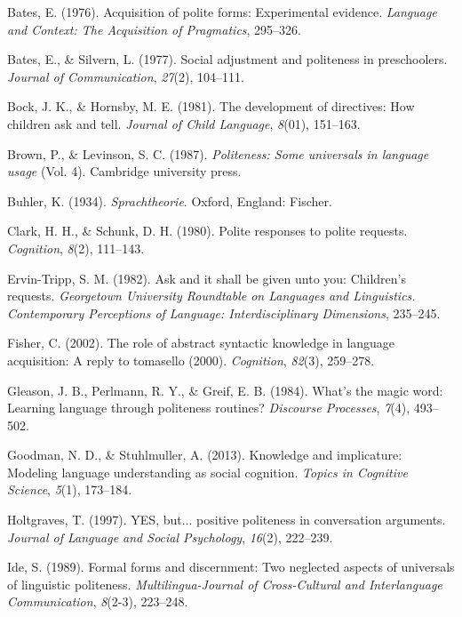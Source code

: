 \documentclass[10pt, letterpaper]{article}
\begin{document}
\hypertarget{ref-bates1976}{}
Bates, E. (1976). Acquisition of polite forms: Experimental evidence.
\emph{Language and Context: The Acquisition of Pragmatics}, 295--326.

\hypertarget{ref-bates1977}{}
Bates, E., \& Silvern, L. (1977). Social adjustment and politeness in
preschoolers. \emph{Journal of Communication}, \emph{27}(2), 104--111.

\hypertarget{ref-bock1981}{}
Bock, J. K., \& Hornsby, M. E. (1981). The development of directives:
How children ask and tell. \emph{Journal of Child Language},
\emph{8}(01), 151--163.

\hypertarget{ref-brown1987}{}
Brown, P., \& Levinson, S. C. (1987). \emph{Politeness: Some universals
in language usage} (Vol. 4). Cambridge university press.

\hypertarget{ref-buhler1934}{}
Buhler, K. (1934). \emph{Sprachtheorie}. Oxford, England: Fischer.

\hypertarget{ref-clark1980}{}
Clark, H. H., \& Schunk, D. H. (1980). Polite responses to polite
requests. \emph{Cognition}, \emph{8}(2), 111--143.

\hypertarget{ref-ervin1982}{}
Ervin-Tripp, S. M. (1982). Ask and it shall be given unto you:
Children's requests. \emph{Georgetown University Roundtable on Languages
and Linguistics. Contemporary Perceptions of Language: Interdisciplinary
Dimensions}, 235--245.

\hypertarget{ref-fisher2002}{}
Fisher, C. (2002). The role of abstract syntactic knowledge in language
acquisition: A reply to tomasello (2000). \emph{Cognition},
\emph{82}(3), 259--278.

\hypertarget{ref-gleason1984}{}
Gleason, J. B., Perlmann, R. Y., \& Greif, E. B. (1984). What's the
magic word: Learning language through politeness routines?
\emph{Discourse Processes}, \emph{7}(4), 493--502.

\hypertarget{ref-goodman2013}{}
Goodman, N. D., \& Stuhlmuller, A. (2013). Knowledge and implicature:
Modeling language understanding as social cognition. \emph{Topics in
Cognitive Science}, \emph{5}(1), 173--184.

\hypertarget{ref-holtgraves1997}{}
Holtgraves, T. (1997). YES, but... positive politeness in conversation
arguments. \emph{Journal of Language and Social Psychology},
\emph{16}(2), 222--239.

\hypertarget{ref-ide1989}{}
Ide, S. (1989). Formal forms and discernment: Two neglected aspects of
universals of linguistic politeness. \emph{Multilingua-Journal of
Cross-Cultural and Interlanguage Communication}, \emph{8}(2-3),
223--248.
\end{document}
